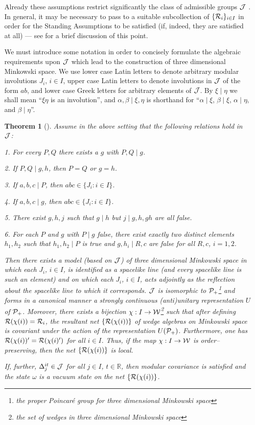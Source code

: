 \documentclass[12pt]{article}
\newtheorem{theorem}{Theorem}[section]
\def\nind{\noindent}
\def\Js{{\cal J}}
\def\Ps{{\cal P}}
\def\Rs{{\cal R}}
\def\Ws{{\cal W}}
\def\nind{\noindent}
\def\RR{{\mathbb R}}
\begin{document}
\medskip

\nind Already these assumptions restrict significantly the class of
admissible groups $\Js$ \cite{BDFS}. In general, it may be
necessary to pass to a suitable subcollection of $\{ \Rs_i \}_{i \in I}$ 
in order for the Standing Assumptions to be satisfied \cite{BDFS} 
(if, indeed, they are satisfied at all) --- see \cite{SuWh} for a brief 
discussion of this point.

     We must introduce some notation in order to concisely formulate
the algebraic requirements upon $\Js$ which lead to the construction
of three dimensional Minkowski space. We use lower case Latin letters to 
denote arbitrary modular involutions $J_i$, $i \in I$, upper case Latin 
letters to denote involutions in $\Js$ of the form $ab$, and lower case 
Greek letters for arbitrary elements of $\Js$. By $\xi \mid \eta$ we shall 
mean ``$\xi\eta$ is an involution'', and $\alpha, \beta \mid \xi, \eta$ is 
shorthand for ``$\alpha \mid \xi$, $\beta \mid \xi$, $\alpha \mid \eta$, and
$\beta \mid \eta$''.

\begin{theorem} [\cite{SuWh}] 
Assume in the above setting that the following relations hold in $\Js$: 

1. For every $P,Q$ there exists a $g$ with $P,Q \mid g$.

2. If $P,Q \mid g,h$, then $P = Q$ or $g = h$.

3. If $a,b,c \mid P$, then $abc \in \{ J_i : i \in I \}$.

4. If $a,b,c \mid g$, then $abc \in \{ J_i : i \in I \}$.

5. There exist $g,h,j$ such that $g \mid h$ but 
$j \mid g,h,gh$ are all false.

6. For each $P$ and $g$ with $P \mid g$ false, there exist exactly
two distinct elements $h_1,h_2$ such that $h_1,h_2 \mid P$ is true and
$g,h_i \mid R,c$ are false for all $R,c$, $i = 1,2$.

     Then there exists a model (based on $\Js$)
of three dimensional Minkowski space in which each 
$J_i$, $i \in I$, is identified as a spacelike line (and every 
spacelike line is such an element) and on which each $J_i$, $i \in I$, 
acts adjointly as the reflection about the spacelike
line to which it corresponds. $\Js$ is isomorphic to $\Ps_+$\footnote{the
proper Poincar\'e group for three dimensional Minkowski space} and forms in
a canonical manner a strongly continuous (anti)unitary representation
$U$ of $\Ps_+$. Moreover, there exists a bijection
$\chi : I \rightarrow \Ws$\footnote{the set of wedges in 
three dimensional Minkowski space} such that after defining
$\Rs(\chi(i)) = \Rs_i$, the resultant net $\{ \Rs(\chi(i)) \}$
of wedge algebras on Minkowski space is covariant under the action
of the representation $U(\Ps_+)$. Furthermore, one has
$\Rs(\chi(i))' = \Rs(\chi(i)')$ for all $i \in I$. Thus, if the
map $\chi : I \rightarrow \Ws$ is order--preserving, then the
net $\{ \Rs(\chi(i)) \}$ is local.

     If, further, $\Delta_j^{it} \in \Js$ for all $j \in I$, $t \in \RR$,
then modular covariance is satisfied and the state $\omega$ is a vacuum
state on the net $\{ \Rs(\chi(i)) \}$.
\end{theorem}
\end{document}
